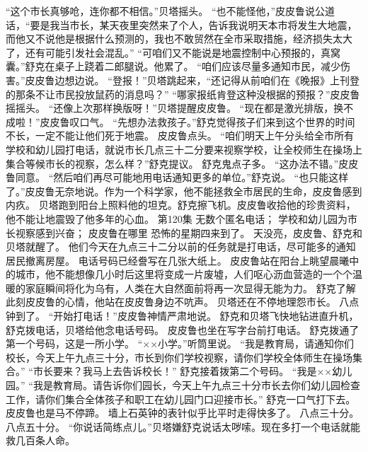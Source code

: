 \documentclass[a4paper,12pt,UTF8,twoside]{ctexbook}
\begin{document}
        “这个市长真够呛，连你都不相信。”贝塔摇头。 
        “也不能怪他，”皮皮鲁说公道话，“要是我当市长，某天夜里突然来了个人，告诉我说明天本市将发生大地震，而他又不说他是根据什么预测的，我也不敢贸然在全市采取措施，经济损失太大了，还有可能引发社会混乱。” 
        “可咱们又不能说是地震控制中心预报的，真窝囊。”舒克在桌子上跷着二郎腿说。他累了。 
        “咱们应该尽量多通知市民，减少伤害。”皮皮鲁边想边说。 
        “登报！”贝塔跳起来，“还记得从前咱们在《晚报》上刊登的那条不让市民投放鼠药的消息吗？” 
        “哪家报纸肯登这种没根据的预报？”皮皮鲁摇摇头。 
        “还像上次那样换版呀！”贝塔提醒皮皮鲁。 
        “现在都是激光排版，换不成啦！”皮皮鲁叹口气。 
        “先想办法救孩子。”舒克觉得孩子们来到这个世界的时间不长，一定不能让他们死于地震。 
        皮皮鲁点头。 
        “咱们明天上午分头给全市所有学校和幼儿园打电话，就说市长几点三十二分要来视察学校，让全校师生在操场上集合等候市长的视察，怎么样？”舒克提议。 
        舒克鬼点子多。 
        “这办法不错。”皮皮鲁同意。 
        “然后咱们再尽可能地用电话通知更多的单位。”舒克说。 
        “也只能这样了。”皮皮鲁无奈地说。作为一个科学家，他不能拯救全市居民的生命，皮皮鲁感到内疚。 
        贝塔跑到阳台上照料他的坦克。舒克擦飞机。皮皮鲁收拾他的珍贵资料，他不能让地震毁了他多年的心血。   第120集 
        无数个匿名电话； 
        学校和幼儿园为市长视察感到兴奋； 
        皮皮鲁在哪里   
        恐怖的星期四来到了。 
        天没亮，皮皮鲁、舒克和贝塔就醒了。 
        他们今天在九点三十二分以前的任务就是打电话，尽可能多的通知居民撤离房屋。 
        电话号码已经誊写在几张大纸上。 
        皮皮鲁站在阳台上眺望晨曦中的城市，他不能想像几小时后这里将变成一片废墟，人们呕心沥血营造的一个个温暖的家庭瞬间将化为乌有，人类在大自然面前将再一次显得无能为力。 
        舒克了解此刻皮皮鲁的心情，他站在皮皮鲁身边不吭声。 
        贝塔还在不停地理怨市长。 
        八点钟到了。 
        “开始打电话！”皮皮鲁神情严肃地说。 
        舒克和贝塔飞快地钻进直升机，舒克拨电话，贝塔给他念电话号码。 
        皮皮鲁也坐在写字台前打电话。 
        舒克拨通了第一个号码，这是一所小学。 
        “××小学。”听筒里说。 
        “我是教育局，请通知你们校长，今天上午九点三十分，市长到你们学校视察，请你们学校全体师生在操场集合。” 
        “市长要来？我马上去告诉校长！” 
        舒克接着拨第二个号码。 
        “我是××幼儿园。” 
        “我是教育局。请告诉你们园长，今天上午九点三十分市长去你们幼儿园检查工作，请你们集合全体孩子和职工在幼儿园门口迎接市长。” 
        舒克一口气打下去。 
        皮皮鲁也是马不停蹄。 
        墙上石英钟的表针似乎比平时走得快多了。 
        八点三十分。 
        八点五十分。 
        “你说话简练点儿。”贝塔嫌舒克说话太哕嗦。现在多打一个电话就能救几百条人命。 
\end{document}
